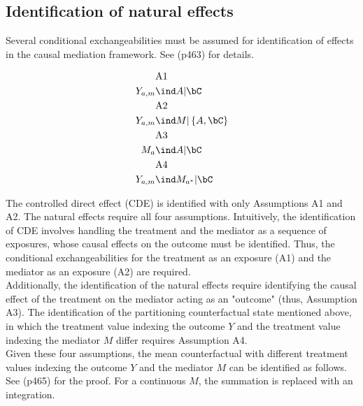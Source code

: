 \documentclass[10pt]{article}
\begin{document}
\subsection{Identification of natural effects}
\label{sec:orgafb357b}
Several conditional exchangeabilities must be assumed for identification of effects in the causal mediation framework. See \cite{vanderweeleExplanationCausalInference2015} (p463) for details.

\begin{align*}
  &\text{A1}\\
  Y_{a,m} &\ind A | \bC\\
  &\text{A2}\\
  Y_{a,m} &\ind M | \left\{ A, \bC \right\}\\
  &\text{A3}\\
  M_{a} &\ind A | \bC\\
  &\text{A4}\\
  Y_{a,m} &\ind M_{a^{*}} |\bC\\
\end{align*}

The controlled direct effect (CDE) is identified with only Assumptions A1 and A2. The natural effects require all four assumptions.  Intuitively, the identification of CDE involves handling the treatment and the mediator as a sequence of exposures, whose causal effects on the outcome must be identified. Thus, the conditional exchangeabilities for the treatment as an exposure (A1) and the mediator as an exposure (A2) are required.\\

Additionally, the identification of the natural effects require identifying the causal effect of the treatment on the mediator acting as an "outcome" (thus, Assumption A3). The identification of the partitioning counterfactual state mentioned above, in which the treatment value indexing the outcome \(Y\) and the treatment value indexing the mediator \(M\) differ requires Assumption A4.\\

Given these four assumptions, the mean counterfactual with different treatment values indexing the outcome \(Y\) and the mediator \(M\) can be identified as follows. See \cite{vanderweeleExplanationCausalInference2015} (p465) for the proof. For a continuous \(M\), the summation is replaced with an integration.
\end{document}
